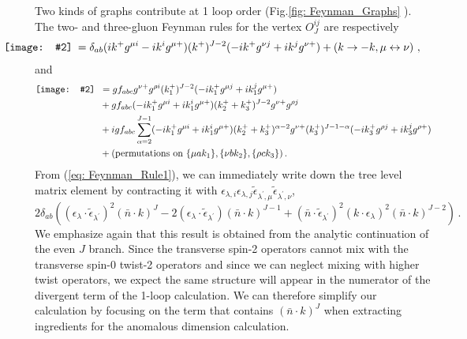 \documentclass[letterpaper,11pt]{article}
\def\beq{\begin{equation}}
\def\eeq{\end{equation}}
\newcommand{\fd}[2]{\parbox{#1}{\texttt{[image: \#2]}}}
\def\nn{{\nonumber}}
\def\beq{\begin{equation}}
\def\eeq{\end{equation}}
\begin{document}
Two kinds of graphs contribute at 1 loop order (Fig.\ref{fig: Feynman_Graphs} ). The two- and three-gluon Feynman rules for the vertex $O_{J}^{ij}$ are respectively
\begin{align}\label{eq: Feynman_Rule1}
\hspace{-1cm}\fd{2.3cm}{figures/FeynmanRule1.pdf}&=\delta_{ab}( ik^{+} g^{\mu i}-ik^{i}g^{\mu +})(k^+)^{J-2}(-ik^+ g^{\nu j}+ik^{j}g^{\nu +})+\left(k\to -k, \mu\leftrightarrow \nu\right)\,,
\end{align}
and
\begin{align}\label{eq: Feynman_Rule2}
\fd{2.4cm}{figures/FeynmanRule2.pdf}&=g f_{abc} g^{\nu +}g^{\rho i}(k_1^+)^{J-2}(-ik_1^{+}g^{\mu j}+ik_1^j g^{\mu +})\nn \\
&+g f_{abc}(-ik_1^{+}g^{\mu i}+ik_1^i g^{\mu +})(k_2^+ + k_3^+)^{J-2}g^{\nu +}g^{\rho j} \nn \\
&+i g f_{abc}\sum_{\alpha=2}^{J-1} (-i k_1^+ g^{\mu i}+i k_1^{i} g^{\mu +}) (k_2^+ +k_3^+)^{\alpha-2} g^{\nu +} (k_3^{+})^{J-1-\alpha}(-ik_3^+ g^{\rho j}+i k_3^{j}g^{\rho +})\nn\\
&+(\mbox{permutations on } \{\mu a k_1\}, \{\nu b k_2\},\{\rho c k_3 \})\,.
\end{align}
From (\ref{eq: Feynman_Rule1}), we can immediately write down the tree level matrix element by contracting it with $\epsilon_{\lambda,i}\epsilon_{\lambda,j}\tilde{\epsilon}_{\lambda^\prime,\mu}\tilde{\epsilon}_{\lambda^\prime,\nu}$,
\beq
2\delta_{ab} \left( 
(\epsilon_\lambda \cdot \tilde{\epsilon}_{\lambda^\prime})^2 (\bar{n}\cdot k)^{J} -2 (\epsilon_\lambda\cdot\tilde{\epsilon}_{\lambda^\prime})(\bar{n}\cdot k)^{J-1} + (\bar{n} \cdot \tilde{\epsilon}_{\lambda^\prime})^2 (k \cdot \epsilon_\lambda)^2 (\bar{n}\cdot k)^{J-2}
\right)\,.
\eeq
We emphasize again that this result is obtained from the analytic continuation of the even $J$ branch. Since the  transverse spin-2 operators cannot mix with the transverse spin-0 twist-2 operators and since we can neglect mixing with higher twist operators, we expect the same structure will appear in the numerator of the divergent term of the 1-loop calculation. We can therefore simplify our calculation by focusing on the term that contains $(\bar{n}\cdot k)^J$ when extracting ingredients for the anomalous dimension calculation.
\end{document}
